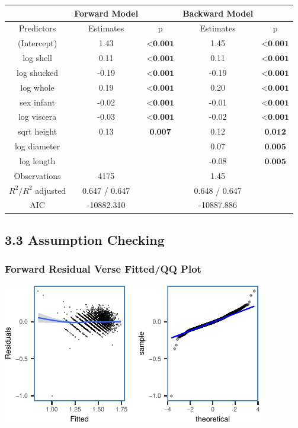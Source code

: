 \documentclass[letterpaper,9pt,twocolumn,twoside,]{pinp}
\begin{document}
\begin{center}
\begin{tabular}{c c c c c}
    & Forward Model & & Backward Model & \\
    \hline
    Predictors & Estimates & p & Estimates & p\\
    \hline
    (Intercept) & 1.43 & $\textbf{<0.001}$ & 1.45 & $\textbf{<0.001}$\\
    log shell & 0.11 & $\textbf{<0.001}$ & 0.11 & $\textbf{<0.001}$\\
    log shucked & -0.19 & $\textbf{<0.001}$ & -0.19 & $\textbf{<0.001}$\\
    log whole & 0.19 & $\textbf{<0.001}$ & 0.20 & $\textbf{<0.001}$\\
    sex infant & -0.02 & $\textbf{<0.001}$ & -0.01 & $\textbf{<0.001}$\\
    log viscera & -0.03 & $\textbf{<0.001}$ & -0.02 & $\textbf{<0.001}$\\
    sqrt height & 0.13 & $\textbf{0.007}$ & 0.12 & $\textbf{0.012}$\\
    log diameter &  & & 0.07 & $\textbf{0.005}$\\
     log length &  & & -0.08 & $\textbf{0.005}$\\
    \hline
    Observations & 4175 &  & 1.45 & \\
    $R^2/R^2$ adjusted & 0.647 / 0.647 & & 0.648 / 0.647 & \\
    AIC & -10882.310 & & -10887.886 & \\
\end{tabular}
\end{center}

\newpage

\hypertarget{assumption-checking}{%
\subsection{3.3 Assumption Checking}\label{assumption-checking}}

\hypertarget{forward-residual-verse-fittedqq-plot}{%
\subsubsection{Forward Residual Verse Fitted/QQ
Plot}\label{forward-residual-verse-fittedqq-plot}}

\begin{center}\includegraphics{ExecSum_files/figure-latex/unnamed-chunk-4-1} \end{center}
\end{document}

